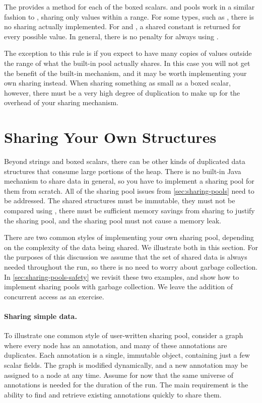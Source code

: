 The \jre provides a  method for each of the boxed
scalars.  and  pools work in a similar fashion
to , sharing only values within a range. For some types,
such as , there is no sharing actually implemented. For
 and , a shared constant is returned for every possible value. 
In general, there is no penalty for always using .

The exception to this rule is if you expect to have many copies
of values outside the range of what the built-in pool
actually shares. In this case you will not get the benefit of the built-in
mechanism, and it may be worth implementing your own sharing instead.  When
sharing something as small as a boxed scalar, however, there must be a very
high degree of duplication to make up for the overhead of your
sharing mechanism.

\section{Sharing Your Own Structures}
\label{sec:canonicalizing-maps}

Beyond strings and boxed scalars, there can be other kinds of
duplicated data structures that consume large portions of the heap. 
There is no built-in Java mechanism to share data
in general, so you have to implement a sharing pool for them from
scratch. All of the sharing pool issues from \autoref{sec:sharing-pools} need
to be addressed. The shared structures must be immutable, they must not be
compared using \code{==}, there must be sufficient memory savings from sharing
to justify the sharing pool, and the sharing pool must not cause a memory leak. 

There are two common styles of implementing your own sharing pool, depending on
the complexity of the data being shared.  We illustrate both in this section. 
For the purposes of this discussion we assume that the set of shared data is
always needed throughout the run, so there is no need to worry about garbage collection. In
\autoref{sec:sharing-pools-safety} we revisit these two examples, and show how
to implement sharing pools with garbage collection.  We leave the addition of
concurrent access as an exercise. 

\paragraph{Sharing simple data.} To illustrate one common style of
user-written sharing pool, consider a graph where every node has an
annotation, and many of these annotations are duplicates.
Each annotation is a single, immutable 
object, containing just a few scalar fields. The graph is modified
dynamically, and a new annotation may be assigned to a node at any
time. Assume for now that the same universe of annotations is needed for the
duration of the run.
The main requirement is the ability to find and
retrieve existing annotations quickly to share them.

